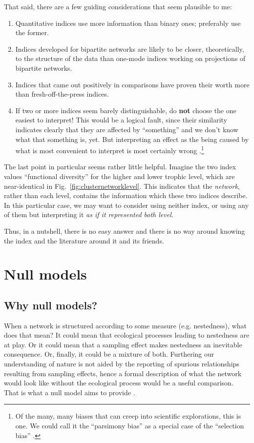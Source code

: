 \documentclass[a4paper, 11pt]{article}\usepackage[]{graphicx}\usepackage[]{color}
\begin{document}
That said, there are a few guiding considerations that seem plausible to me:
\begin{enumerate}
\item Quantitative indices use more information than binary ones; preferably use the former.
\item Indices developed for bipartite networks are likely to be closer, theoretically, to the structure of the data than one-mode indices working on projections of bipartite networks.
\item Indices that came out positively in comparisons have proven their worth more than fresh-off-the-press indices.
\item If two or more indices seem barely distinguishable, do \textbf{not} choose the one easiest to interpret! This would be a logical fault, since their similarity indicates clearly that they are affected by ``something'' and we don't know what that something is, yet. But interpreting an effect as the being caused by what is most convenient to interpret is most certainly wrong \citep{Shermer2012}.\footnote{Of the many, many biases that can creep into scientific explorations, this is one. We could call it the ``parsimony bias'' as a special case of the ``selection bias'' \citep{Shermer2012}.}
\end{enumerate}
%
The last point in particular seems rather little helpful. Imagine the two index values ``functional diversity'' for the higher and lower trophic level, which are near-identical in Fig.~\ref{fig:clusternetworklevel}. This indicates that the \emph{network}, rather than each level, contains the information which these two indices describe. In this particular case, we may want to consider using neither index, or using any of them but interpreting it \emph{as if it represented \emph{both} level}.

Thus, in a nutshell, there is no easy answer and there is no way around knowing the index and the literature around it and its friends.





\section{Null models} %
  \label{sec:nullmodels}

\subsection{Why null models?}
When a network is structured according to some measure (e.g. nestedness), what does that mean? It could mean that ecological processes leading to nestedness are at play. Or it could mean that a sampling effect makes nestedness an inevitable consequence. Or, finally, it could be a mixture of both. Furthering our understanding of nature is not aided by the reporting of spurious relationships resulting from sampling effects, hence a formal description of what the network would look like without the ecological process would be a useful comparison. That is what a null model aims to provide \citep{Gotelli1996}. 
\end{document}
